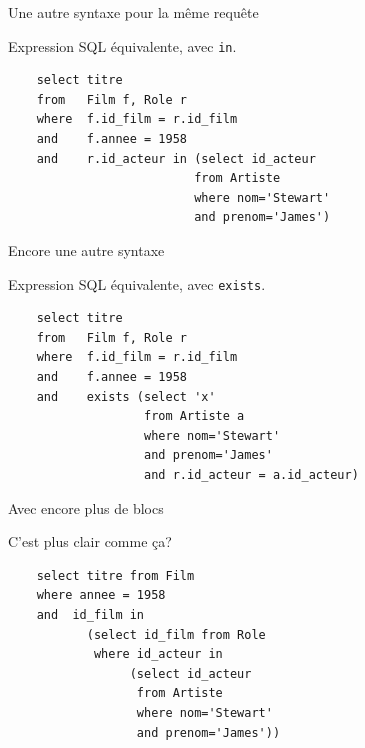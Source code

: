\begin{frame}[fragile]{Une autre syntaxe pour la même requête}

Expression SQL équivalente, avec \texttt{in}.

\vfill

\begin{verbatim}
    select titre
    from   Film f, Role r
    where  f.id_film = r.id_film
    and    f.annee = 1958
    and    r.id_acteur in (select id_acteur
                          from Artiste
                          where nom='Stewart' 
                          and prenom='James')
\end{verbatim}

\end{frame}

\begin{frame}[fragile]{Encore une autre syntaxe}

Expression SQL équivalente, avec \texttt{exists}.

\vfill

\begin{verbatim}
    select titre
    from   Film f, Role r
    where  f.id_film = r.id_film
    and    f.annee = 1958
    and    exists (select 'x'
                   from Artiste a
                   where nom='Stewart' 
                   and prenom='James'
                   and r.id_acteur = a.id_acteur)
\end{verbatim}

\end{frame}

\begin{frame}[fragile]{Avec encore plus de blocs}

C'est plus clair comme ça?

\vfill

\begin{verbatim}
    select titre from Film
    where annee = 1958
    and  id_film in
           (select id_film from Role
            where id_acteur in 
                 (select id_acteur 
                  from Artiste
                  where nom='Stewart'
                  and prenom='James'))
\end{verbatim}

\end{frame}

